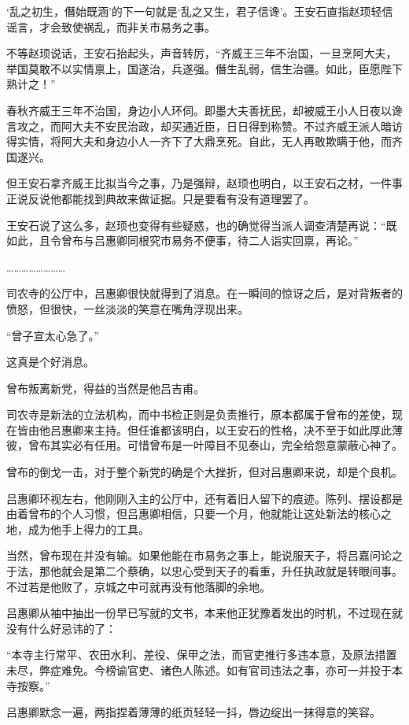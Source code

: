 ‘乱之初生，僭始既涵’的下一句就是‘乱之又生，君子信谗’。王安石直指赵顼轻信谣言，才会致使祸乱，而非关市易务之事。

不等赵顼说话，王安石抬起头，声音转厉，“齐威王三年不治国，一旦烹阿大夫，举国莫敢不以实情禀上，国遂治，兵遂强。僭生乱弱，信生治疆。如此，臣愿陛下熟计之！”

春秋齐威王三年不治国，身边小人环伺。即墨大夫善抚民，却被威王小人日夜以谗言攻之，而阿大夫不安民治政，却买通近臣，日日得到称赞。不过齐威王派人暗访得实情，将阿大夫和身边小人一齐下了大鼎烹死。自此，无人再敢欺瞒于他，而齐国遂兴。

但王安石拿齐威王比拟当今之事，乃是强辩，赵顼也明白，以王安石之材，一件事正说反说他都能找到典故来做证据。只是要看有没有道理罢了。

王安石说了这么多，赵顼也变得有些疑惑，也的确觉得当派人调查清楚再说：“既如此，且令曾布与吕惠卿同根究市易务不便事，待二人诣实回禀，再论。”

……………………

司农寺的公厅中，吕惠卿很快就得到了消息。在一瞬间的惊讶之后，是对背叛者的愤怒，但很快，一丝淡淡的笑意在嘴角浮现出来。

“曾子宣太心急了。”

这真是个好消息。

曾布叛离新党，得益的当然是他吕吉甫。

司农寺是新法的立法机构，而中书检正则是负责推行，原本都属于曾布的差使，现在皆由他吕惠卿来主持。但任谁都该明白，以王安石的性格，决不至于如此厚此薄彼，曾布其实必有任用。可惜曾布是一叶障目不见泰山，完全给怨意蒙蔽心神了。

曾布的倒戈一击，对于整个新党的确是个大挫折，但对吕惠卿来说，却是个良机。

吕惠卿环视左右，他刚刚入主的公厅中，还有着旧人留下的痕迹。陈列、摆设都是由着曾布的个人习惯，但吕惠卿相信，只要一个月，他就能让这处新法的核心之地，成为他手上得力的工具。

当然，曾布现在并没有输。如果他能在市易务之事上，能说服天子，将吕嘉问论之于法，那他就会是第二个蔡确，以忠心受到天子的看重，升任执政就是转眼间事。不过若是他败了，京城之中可就再没有他落脚的余地。

吕惠卿从袖中抽出一份早已写就的文书，本来他正犹豫着发出的时机，不过现在就没有什么好忌讳的了：

“本寺主行常平、农田水利、差役、保甲之法，而官吏推行多违本意，及原法措置未尽，弊症难免。今榜谕官吏、诸色人陈述。如有官司违法之事，亦可一并投于本寺按察。”

吕惠卿默念一遍，两指捏着薄薄的纸页轻轻一抖，唇边绽出一抹得意的笑容。

